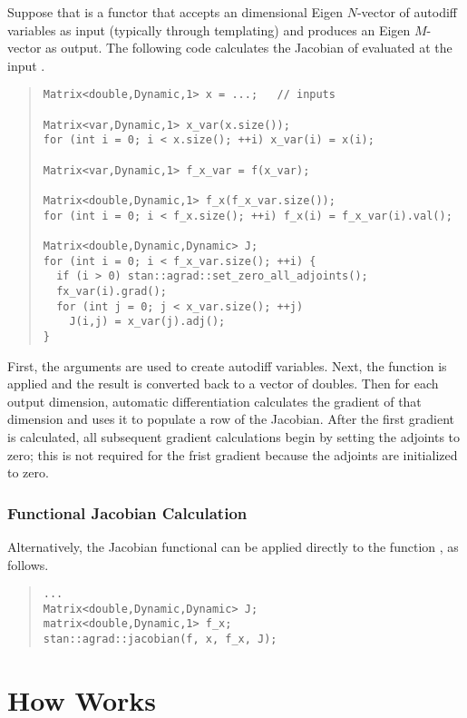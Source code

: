 \documentclass[10pt]{article}
\begin{document}
Suppose that  is a functor that accepts an dimensional Eigen
$N$-vector of autodiff variables as input (typically through
templating) and produces an Eigen $M$-vector as output.
The following code calculates the Jacobian of  evaluated 
at the input .

\begin{quote}
\begin{Verbatim}
Matrix<double,Dynamic,1> x = ...;   // inputs

Matrix<var,Dynamic,1> x_var(x.size());
for (int i = 0; i < x.size(); ++i) x_var(i) = x(i);

Matrix<var,Dynamic,1> f_x_var = f(x_var);

Matrix<double,Dynamic,1> f_x(f_x_var.size());
for (int i = 0; i < f_x.size(); ++i) f_x(i) = f_x_var(i).val();

Matrix<double,Dynamic,Dynamic> J;
for (int i = 0; i < f_x_var.size(); ++i) {
  if (i > 0) stan::agrad::set_zero_all_adjoints();
  fx_var(i).grad();
  for (int j = 0; j < x_var.size(); ++j)
    J(i,j) = x_var(j).adj();
}
\end{Verbatim}
\end{quote}
%
First, the arguments are used to create autodiff variables.  Next, the
function is applied and the result is converted back to a vector of
doubles.  Then for each output dimension, automatic differentiation
calculates the gradient of that dimension and uses it to populate a
row of the Jacobian.  After the first gradient is calculated, all
subsequent gradient calculations begin by setting the adjoints to
zero; this is not required for the frist gradient because the adjoints
are initialized to zero.


\subsubsection{Functional Jacobian Calculation}

Alternatively, the Jacobian functional can be applied directly to the
function , as follows.
%
\begin{quote}
\begin{Verbatim}
...
Matrix<double,Dynamic,Dynamic> J;
matrix<double,Dynamic,1> f_x;
stan::agrad::jacobian(f, x, f_x, J);
\end{Verbatim}
\end{quote}



\section{How  Works}
\end{document}
